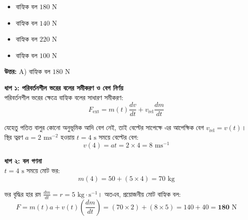 \documentclass[12pt, a4paper]{article}
\begin{document}
\vspace{1em}
\begin{center}
\end{center}
\vspace{1em}

\begin{itemize}[label={}, leftmargin=1cm, itemsep=0.5em]
    \item[\textbf{A)}] বাহ্যিক বল $180\text{ N}$
    \item[\textbf{B)}] বাহ্যিক বল $140\text{ N}$
    \item[\textbf{C)}] বাহ্যিক বল $220\text{ N}$
    \item[\textbf{D)}] বাহ্যিক বল $100\text{ N}$
\end{itemize}

\vspace{0.5em}
\begin{tcolorbox}[answerbox]
    \textbf{\color{success} উত্তর:} A) বাহ্যিক বল $180\text{ N}$
\end{tcolorbox}
\vspace{1em}

\begin{tcolorbox}[solutionbox={সমাধান (Solution)}]
    \noindent
    \textbf{ধাপ ১: পরিবর্তনশীল ভরের বলের সমীকরণ ও বেগ নির্ণয়} \\
    পরিবর্তনশীল ভরের ক্ষেত্রে বাহ্যিক বলের সাধারণ সমীকরণ:
    \[ F_{\text{ext}} = m(t) \frac{dv}{dt} + v_{\text{rel}} \frac{dm}{dt} \]
    
    যেহেতু পতিত বালুর কোনো অনুভূমিক আদি বেগ নেই, তাই বেল্টের সাপেক্ষে এর আপেক্ষিক বেগ $v_{\text{rel}} = v(t)$। স্থির ত্বরণ $a = 2\text{ ms}^{-2}$ হওয়ায় $t = 4\text{ s}$ সময়ে বেল্টের বেগ:
    \[ v(4) = a t = 2 \times 4 = 8\text{ ms}^{-1} \]
    
    \vspace{0.5em}
    \noindent\textbf{ধাপ ২: বল গণনা} \\
    $t = 4\text{ s}$ সময়ে মোট ভর:
    \[ m(4) = 50 + (5 \times 4) = 70\text{ kg} \]
    
    ভর বৃদ্ধির হার রম $\frac{dm}{dt} = r = 5\text{ kg}\cdot\text{s}^{-1}$। অতএব, প্রয়োজনীয় মোট বাহ্যিক বল:
    \[ F = m(t) a + v(t) \left(\frac{dm}{dt}\right) = (70 \times 2) + (8 \times 5) = 140 + 40 = \mathbf{180}\text{ N} \]
\end{tcolorbox}
\end{document}
